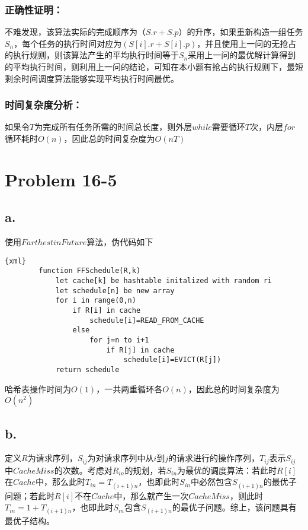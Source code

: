 \documentclass[12pt]{article}
\begin{document}
        \subsubsection*{正确性证明：}
            不难发现，该算法实际的完成顺序为$（S.r+S.p）$的升序，如果重新构造一组任务$S_n$，每个任务的执行时间对应为$(S[i].r+S[i].p)$，并且使用上一问的无抢占的执行规则，则该算法产生的平均执行时间等于$S_n$采用上一问的最优解计算得到的平均执行时间，则利用上一问的结论，可知在本小题有抢占的执行规则下，最短剩余时间调度算法能够实现平均执行时间最优。
        \subsubsection*{时间复杂度分析：}
            如果令$T$为完成所有任务所需的时间总长度，则外层$while$需要循环$T$次，内层$for$循环耗时$O(n)$，因此总的时间复杂度为$O(nT)$
  \section*{Problem 16-5}
    \subsection*{a.}
        使用$Farthest in Future$算法，伪代码如下
        \begin{lstlisting}{xml}
        function FFSchedule(R,k)
            let cache[k] be hashtable initalized with random ri
            let schedule[n] be new array
            for i in range(0,n)
                if R[i] in cache
                    schedule[i]=READ_FROM_CACHE
                else
                    for j=n to i+1
                        if R[j] in cache
                            schedule[i]=EVICT(R[j])
            return schedule
        \end{lstlisting}
        哈希表操作时间为$O(1)$，一共两重循环各$O(n)$，因此总的时间复杂度为$O(n^2)$
    \subsection*{b.}
        定义$R$为请求序列，$S_{ij}$为对请求序列中从$i$到$j$的请求进行的操作序列，$T_{ij}$表示$S_{ij}$中$Cache Miss$的次数。考虑对$R_{in}$的规划，若$S_{in}$为最优的调度算法：若此时$R[i]$在$Cache$中，那么此时$T_{in}=T_{(i+1)n}$，也即此时$S_{in}$中必然包含$S_{(i+1)n}$的最优子问题；若此时$R[i]$不在$Cache$中，那么就产生一次$Cache Miss$，则此时$T_{in}=1+T_{(i+1)n}$，也即此时$S_{in}$包含$S_{(i+1)n}$的最优子问题。综上，该问题具有最优子结构。
\end{document}
